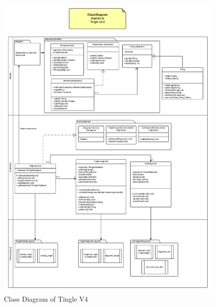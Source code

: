 \documentclass{article}
\begin{document}
\begin{figure}[h!]
	\centering
	\includegraphics[scale=0.4]{"TingleApp_ClassDiagram V08"}
	\caption{Class Diagram of Tingle V4}
	\label{fig:TingleApp_ClassDiagramV08}
\end{figure}
\end{document}
